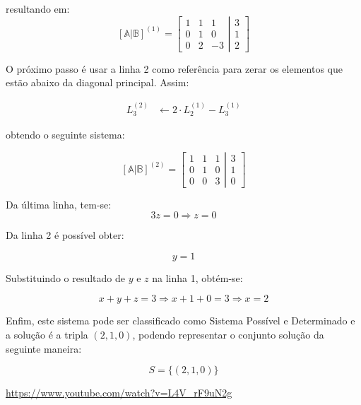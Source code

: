 \begin{example}
	resultando em:
	\[
	\left[ \mathbb{A}|\mathbb{B}\right ]^{(1)}=\left[ \begin{matrix}1&1&1\\0&1&0\\0&2&-3 \end{matrix} \left| \begin{matrix} 3\\1\\2\end{matrix}\right. \right ]
	\]
	
	O próximo passo é usar a linha 2 como referência para zerar os elementos que estão abaixo da diagonal principal. Assim:
	
	\[
	\begin{aligned}
	L_3^{(2)} &\leftarrow 2 \cdot L_2^{(1)}-L_3^{(1)}
	\end{aligned}
	\]
	
	obtendo o seguinte sistema:
	
	\[
	\left[ \mathbb{A}|\mathbb{B}\right ]^{(2)}=\left[ \begin{matrix}1&1&1\\0&1&0\\0&0&3 \end{matrix} \left| \begin{matrix} 3\\1\\0\end{matrix}\right. \right ]
	\]
	
	Da última linha, tem-se:
	\[
	3z=0 \Rightarrow z=0
	\]
	
	Da linha 2 é possível obter:
	
	\[
	y=1
	\]
		
	Substituindo o resultado de $y$ e $z$ na linha 1, obtém-se:
	
	\[
	x+y+z=3 \Rightarrow x+1+0=3 \Rightarrow x=2
	\]

	Enfim, este sistema pode ser classificado como Sistema Possível e Determinado e a solução é a tripla $(2,1,0)$, podendo representar o conjunto solução da seguinte maneira:
	
	\[
	S=\{(2,1,0)\}
	\]


\doutor \url{https://www.youtube.com/watch?v=L4V_rF9uN2g}
\end{example}

























